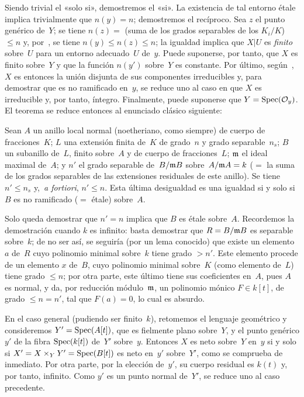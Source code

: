 {Siendo trivial el «solo si», demostremos el «si».}
{La existencia de tal entorno étale implica trivialmente que $n(y)=n$; demostremos el recíproco.}%
Sea $z$ el punto genérico de~$Y$; se tiene $n(z)=$ (suma de los grados separables de los $K_i/K$) $\leq n$ y, por~, se tiene $n(y)\leq n(z)\leq n$; la igualdad implica que $X|U$ es \emph{finito} sobre~$U$ para un entorno adecuado~$U$ de~$y$. Puede suponerse, por tanto, que $X$ es finito sobre~$Y$ y que la función $n(y')$ sobre~$Y$ es constante. Por último, según~, $X$ es entonces la unión disjunta de sus componentes irreducibles y, para demostrar que es no ramificado en~$y$, se reduce uno al caso en que $X$ es irreducible y, por tanto, íntegro. Finalmente, puede suponerse que $Y=\operatorname{Spec}(\mathcal{O}_y)$. El teorema se reduce entonces al enunciado clásico siguiente:

\begin{corollaire}
\label{I.10.12}
Sean $A$ un anillo local normal (noetheriano, como siempre) de cuerpo de fracciones~$K$; $L$ una extensión finita de~$K$ de grado~$n$ y grado separable~$n_s$; $B$ un subanillo de~$L$, finito sobre~$A$ y de cuerpo de fracciones~$L$; $\mathfrak{m}$ el ideal maximal de~$A$; y $n'$ el grado separable de~$B/\mathfrak{m}B$ sobre~$A/\mathfrak{m}A=k$ ($=$ la suma de los grados separables de las extensiones residuales de este anillo). Se tiene $n'\leq n_s$ y, \,\emph{a fortiori}, $n'\leq n$. Esta última desigualdad es una igualdad si y solo si $B$ es no ramificado ($=$ étale) sobre~$A$.
\end{corollaire}

Solo queda demostrar que $n'=n$ implica que $B$ es étale sobre~$A$. Recordemos la demostración cuando $k$ es infinito: basta demostrar que $R=B/\mathfrak{m}B$ es separable sobre~$k$; de no ser así, se seguiría (por un lema conocido) que existe un elemento $a$ de~$R$ cuyo polinomio minimal sobre~$k$ tiene grado $>n'$. Este elemento procede de un elemento $x$ de~$B$, cuyo polinomio minimal sobre~$K$ (como elemento de~$L$) tiene grado $\leq n$; por otra parte, este último tiene sus coeficientes en~$A$, pues $A$ es normal, y da, por reducción módulo~$\mathfrak{m}$, un polinomio mónico $F\in k[t]$, de grado $\leq n=n'$, tal que $F(a)=0$, lo cual es absurdo.

En
el caso general (pudiendo ser finito~$k$), retomemos el lenguaje geométrico y consideremos $Y'=\operatorname{Spec}(A[t])$, que es fielmente plano sobre~$Y$, y el punto genérico $y'$ de la fibra $\operatorname{Spec}(k[t])$ de~$Y'$ sobre~$y$. Entonces $X$ es neto sobre~$Y$ en~$y$ si y solo si $X'=X\times_YY'=\operatorname{Spec}(B[t])$ es neto en~$y'$ sobre~$Y'$, como se comprueba de inmediato. Por otra parte, por la elección de~$y'$, su cuerpo residual es $k(t)$ y, por tanto, infinito. Como $y'$ es un punto normal de~$Y'$, se reduce uno al caso precedente.

